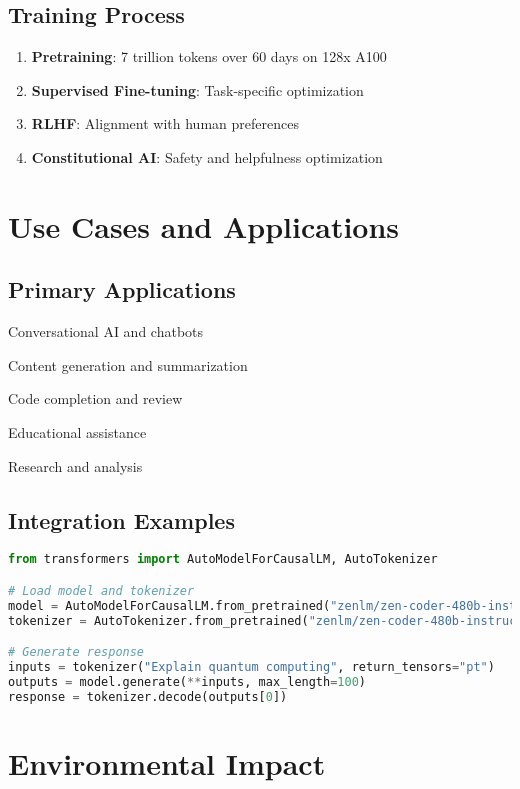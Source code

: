 \documentclass[11pt,a4paper]{article}
\begin{document}
\subsection{Training Process}
\begin{enumerate}
    \item \textbf{Pretraining}: 7 trillion tokens over 60 days on 128x A100
    \item \textbf{Supervised Fine-tuning}: Task-specific optimization
    \item \textbf{RLHF}: Alignment with human preferences
    \item \textbf{Constitutional AI}: Safety and helpfulness optimization
\end{enumerate}

\section{Use Cases and Applications}

\subsection{Primary Applications}
\item Conversational AI and chatbots
\item Content generation and summarization
\item Code completion and review
\item Educational assistance
\item Research and analysis

\subsection{Integration Examples}

\begin{lstlisting}[language=Python, caption=Basic Usage Example]
from transformers import AutoModelForCausalLM, AutoTokenizer

# Load model and tokenizer
model = AutoModelForCausalLM.from_pretrained("zenlm/zen-coder-480b-instruct")
tokenizer = AutoTokenizer.from_pretrained("zenlm/zen-coder-480b-instruct")

# Generate response
inputs = tokenizer("Explain quantum computing", return_tensors="pt")
outputs = model.generate(**inputs, max_length=100)
response = tokenizer.decode(outputs[0])
\end{lstlisting}

\section{Environmental Impact}
\end{document}
